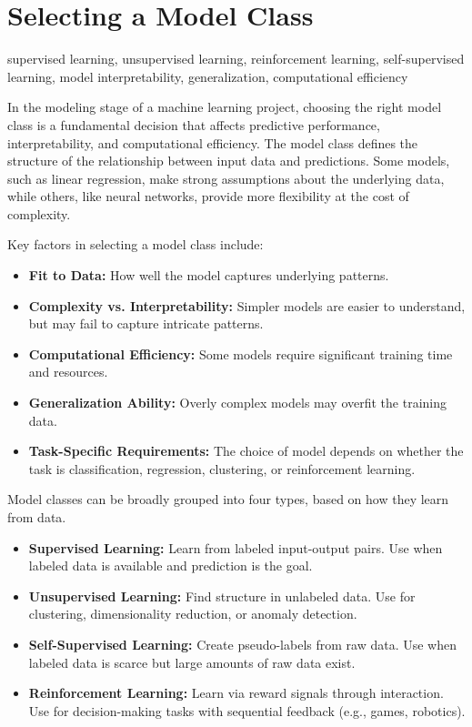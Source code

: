 \documentclass[12pt,openany]{book}
\begin{document}
\section{Selecting a Model Class}

\begin{keywordsbox}
supervised learning, unsupervised learning, reinforcement learning, self-supervised learning, model interpretability, generalization, computational efficiency
\end{keywordsbox}


In the modeling stage of a machine learning project, choosing the right model class is a fundamental decision that affects predictive performance, interpretability, and computational efficiency. The model class defines the structure of the relationship between input data and predictions. Some models, such as linear regression, make strong assumptions about the underlying data, while others, like neural networks, provide more flexibility at the cost of complexity.
\newline

Key factors in selecting a model class include:
\begin{itemize}
    \item \textbf{Fit to Data:} How well the model captures underlying patterns.
    \item \textbf{Complexity vs. Interpretability:} Simpler models are easier to understand, but may fail to capture intricate patterns.
    \item \textbf{Computational Efficiency:} Some models require significant training time and resources.
    \item \textbf{Generalization Ability:} Overly complex models may overfit the training data.
    \item \textbf{Task-Specific Requirements:} The choice of model depends on whether the task is classification, regression, clustering, or reinforcement learning.
\end{itemize}

Model classes can be broadly grouped into four types, based on how they learn from data.

\begin{itemize}
    \item \textbf{Supervised Learning:} Learn from labeled input-output pairs. Use when labeled data is available and prediction is the goal.
    \item \textbf{Unsupervised Learning:} Find structure in unlabeled data. Use for clustering, dimensionality reduction, or anomaly detection.
    \item \textbf{Self-Supervised Learning:} Create pseudo-labels from raw data. Use when labeled data is scarce but large amounts of raw data exist.
    \item \textbf{Reinforcement Learning:} Learn via reward signals through interaction. Use for decision-making tasks with sequential feedback (e.g., games, robotics).
\end{itemize}
\end{document}
